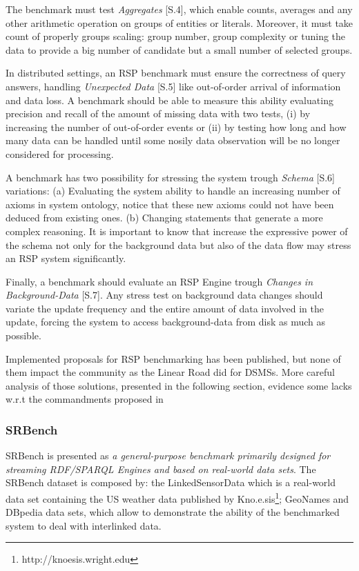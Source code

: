 The benchmark must test \textit{Aggregates} [S.4], which enable counts, averages and any other arithmetic operation on groups of entities or literals. Moreover, it must take count of properly groups scaling: group number, group complexity or tuning the data to provide a big number of candidate but a small number of selected groups.

In distributed settings, an RSP benchmark must ensure the correctness of query answers, handling \textit{Unexpected Data} [S.5] like out-of-order arrival of information and data loss. A benchmark should be able to measure this ability evaluating precision and recall of the amount of missing data with two tests, (i) by increasing the number of out-of-order events or (ii) by testing how long and how many data can be handled until some nosily data observation will be no longer considered for processing.

A benchmark has two possibility for stressing the system trough \textit{Schema} [S.6] variations: (a) Evaluating the system ability to handle an increasing number of axioms in system ontology, notice that these new axioms could not have been deduced from existing ones. (b) Changing statements that generate a more complex reasoning. It is important to know that increase the expressive power of the schema not only for the background data but also of the data flow may stress an RSP system significantly.

Finally, a benchmark should evaluate an RSP Engine trough \textit{Changes in Background-Data} [S.7]. Any stress test on background data changes should variate the update frequency and the entire amount of data involved in the update, forcing the system to access background-data from disk as much as possible.

Implemented proposals for RSP benchmarking has been published, but none of them impact the community as the Linear Road did for DSMSs. More careful analysis of those solutions, presented in the following section, evidence some lacks w.r.t the commandments proposed in \cite{DBLP:conf/esws/ScharrenbachUMVB13} 

\subsubsection{SRBench}\label{sec:srbench}

SRBench is presented as \textit{a general-purpose benchmark primarily designed for streaming RDF/SPARQL Engines and based on real-world data sets}\cite{Zhang2012}. The SRBench dataset is composed by: the LinkedSensorData  which  is a real-world data set containing the US weather data published by Kno.e.sis\footnote{ http://knoesis.wright.edu};  GeoNames and DBpedia data sets, which allow to demonstrate the ability of the benchmarked system to deal with interlinked data.

